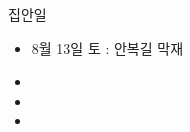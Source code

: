 \documentclass[aspectratio=1610,17pt,xcolor=pdftex,dvipsnames,table,handout]{beamer}
\begin{document}
		\begin{frame} [t,plain]
			\begin{block} {집안일}
			\begin{itemize}
				\item 8월 13일 토 : 안복길 막재
				\item 
				\item 
				\item 
			\end{itemize}
			\end{block}
		\end{frame}



\end{document}
